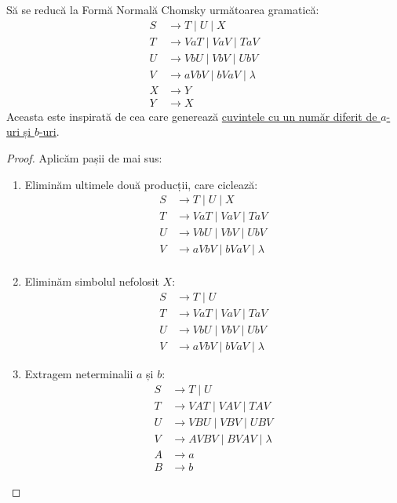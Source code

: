 Să se reducă la Formă Normală Chomsky următoarea gramatică:
\begin{align*}
    S & \to T \mid U \mid X             \\
    T & \to VaT \mid VaV \mid TaV       \\
    U & \to VbU \mid VbV \mid UbV       \\
    V & \to aVbV \mid bVaV \mid \lambda \\
    X & \to Y                           \\
    Y & \to X
\end{align*}
Aceasta este inspirată de cea care generează \href{https://en.wikipedia.org/wiki/Context-free_grammar#Distinct_number_of_a's_and_b's}{cuvintele cu un număr diferit de \(a\)-uri și \(b\)-uri}.

\begin{proof}
    Aplicăm pașii de mai sus:
    \begin{enumerate}
        \item Eliminăm ultimele două producții, care ciclează:
              \begin{align*}
                  S & \to T \mid U \mid X             \\
                  T & \to VaT \mid VaV \mid TaV       \\
                  U & \to VbU \mid VbV \mid UbV       \\
                  V & \to aVbV \mid bVaV \mid \lambda \\
              \end{align*}

        \item Eliminăm simbolul nefolosit \(X\):
              \begin{align*}
                  S & \to T \mid U                    \\
                  T & \to VaT \mid VaV \mid TaV       \\
                  U & \to VbU \mid VbV \mid UbV       \\
                  V & \to aVbV \mid bVaV \mid \lambda
              \end{align*}

        \item Extragem neterminalii \(a\) și \(b\):
              \begin{align*}
                  S & \to T \mid U                    \\
                  T & \to VAT \mid VAV \mid TAV       \\
                  U & \to VBU \mid VBV \mid UBV       \\
                  V & \to AVBV \mid BVAV \mid \lambda \\
                  A & \to a                           \\
                  B & \to b
              \end{align*}


\end{enumerate}
\end{proof}
